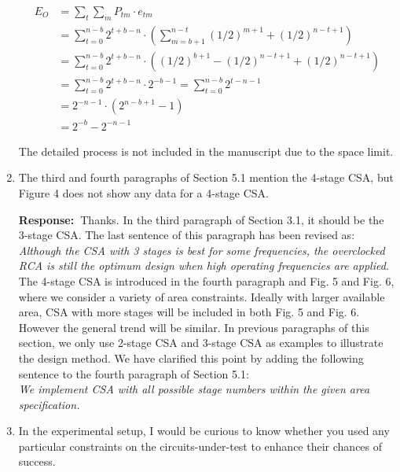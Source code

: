 \documentclass[a4paper, 11pt]{article}
\def\Response{\noindent \textbf{Response:~}}
\newcommand{\Question}[1]{\textcolor[rgb]{0.51,0.00,0.00}{#1}}
\newcommand{\PaperText}[1]{\emph{#1}}
\begin{document}
\begin{enumerate}
      \begin{align*}
        E_O&=\sum_t\sum_m P_{tm}\cdot e_{tm}\\ &=\sum_{t=0}^{n-b}2^{t+b-n}\cdot\left(\sum_{m=b+1}^{n-t}(1/2)^{m+1}+(1/2)^{n-t+1}\right)\\
        &=\sum_{t=0}^{n-b}2^{t+b-n}\cdot\left((1/2)^{b+1}-(1/2)^{n-t+1}+(1/2)^{n-t+1}\right)\\
        &=\sum_{t=0}^{n-b}2^{t+b-n}\cdot2^{-b-1}=\sum_{t=0}^{n-b}2^{t-n-1}\\
        &=2^{-n-1}\cdot\left(2^{n-b+1}-1\right)\\
        &=2^{-b}-2^{-n-1}
      \end{align*}
      
      The detailed process is not included in the manuscript due to the space limit.
      
  \item \Question{The third and fourth paragraphs of Section 5.1 mention the 4-stage CSA, but Figure 4 does not show any data for a 4-stage CSA.}
      
      \Response Thanks. In the third paragraph of Section 3.1, it should be the 3-stage CSA. The last sentence of this paragraph has been revised as:\\
      
      \PaperText{Although the CSA with 3 stages is best for some frequencies, the overclocked RCA is still the optimum design when high operating frequencies are applied.}\\
      
      The 4-stage CSA is introduced in the fourth paragraph and Fig. 5 and Fig. 6, where we consider a variety of area constraints. Ideally with larger available area, CSA with more stages will be included in both Fig. 5 and Fig. 6. However the general trend will be similar. In previous paragraphs of this section, we only use 2-stage CSA and 3-stage CSA as examples to illustrate the design method. We have clarified this point by adding the following sentence to the fourth paragraph of Section 5.1:\\
      
      \PaperText{We implement CSA with all possible stage numbers within the given area specification.}\\
      
  \item \Question{In the experimental setup, I would be curious to know whether you used any particular constraints on the circuits-under-test to enhance their chances of success.}
      

\end{enumerate}
\end{document}
